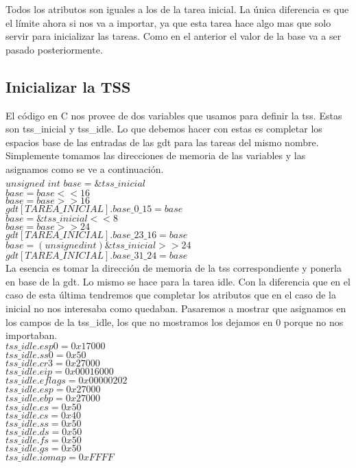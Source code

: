 \documentclass[a4paper]{article}
\begin{document}
Todos los atributos son iguales a los de la tarea inicial. La única diferencia es que el límite ahora si nos va a importar, ya que esta tarea hace algo mas que solo servir para inicializar las tareas. Como en el anterior el valor de la base va a ser pasado posteriormente.

\subsection{Inicializar la TSS}

El código en C nos provee de dos variables que usamos para definir la tss. Estas son tss\_inicial y tss\_idle. Lo que debemos hacer con estas es completar los espacios base de las entradas de las gdt para las tareas del mismo nombre. Simplemente tomamos las direcciones de memoria de las variables y las asignamos como se ve a continuación.\\
$unsigned$ $int$ $base = \&tss\_inicial\;$\\
$base = base << 16\;$\\
$base = base >> 16\;$\\
$gdt[TAREA\_INICIAL].base\_0\_15 = base \;$\\
$base =  \&tss\_inicial << 8\;$\\
$base = base >> 24\;$\\
$gdt[TAREA\_INICIAL].base\_23\_16 = base\;$\\
$base = ( unsigned int ) \&tss\_inicial >> 24\;$\\
$gdt[TAREA\_INICIAL].base\_31\_24 = base\;$\\

La esencia es tomar la dirección de memoria de la tss correspondiente y ponerla en base de la gdt. Lo mismo se hace para la tarea idle. Con la diferencia que en el caso de esta última tendremos que completar los atributos que en el caso de la inicial no nos interesaba como quedaban. Pasaremos a mostrar que asignamos en los campos de la tss\_idle, los que no mostramos los dejamos en 0 porque no nos importaban.\\
    $tss\_idle.esp0 = 0x17000$\\
    $tss\_idle.ss0 = 0x50$\\
    $tss\_idle.cr3 = 0x27000$\\ 
    $tss\_idle.eip = 0x00016000$\\
    $tss\_idle.eflags = 0x00000202$\\ 
    $tss\_idle.esp = 0x27000$\\ 
    $tss\_idle.ebp = 0x27000$\\
    $tss\_idle.es = 0x50$\\
    $tss\_idle.cs = 0x40$\\
    $tss\_idle.ss = 0x50$\\
    $tss\_idle.ds = 0x50$\\
    $tss\_idle.fs = 0x50$\\
    $tss\_idle.gs = 0x50$\\
    $tss\_idle.iomap = 0xFFFF$\\
\end{document}
